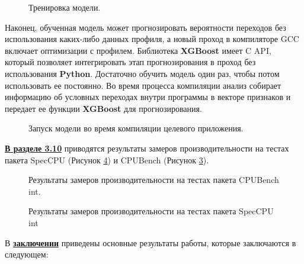   \begin{figure}[htbp]
  	\centering
  	
  	\caption{Тренировка модели.}
  	\label{op:mlpgo2}
  \end{figure}
  Наконец, обученная модель может прогнозировать вероятности  переходов  без использования каких-либо данных профиля, а новый проход в компиляторе GCC включает оптимизации с профилем. Библиотека \textbf{XGBoost} имеет C API, который позволяет интегрировать этап прогнозирования в проход без использования \textbf{Python}. Достаточно обучить модель один раз, чтобы потом использовать ее постоянно. Во время процесса компиляции  анализ собирает информацию об условных переходах  внутри программы в векторе признаков и передает ее функции \textbf{XGBoost} для прогнозирования.
  \begin{figure}[htbp]
  	\centering
  	
  	\caption{Запуск модели во время компиляции целевого приложения.}
  	\label{op:mlpgo3}
  \end{figure}
 
  \underline{\textbf{В разделе 3.10}} приводятся результаты замеров производительности на тестах пакета SpecCPU (Рисунок \ref{fig:spec_int_speedup}) и CPUBench (Рисунок \ref{fig:spubench_int_speedup}).
  
  \begin{figure}[ht]
  	\caption{Результаты замеров производительности на тестах  пакета CPUBench int.}\label{fig:spubench_int_speedup}
  \end{figure}
  
  \begin{figure}[ht]
  	\caption{Результаты замеров производительности на тестах  пакета SpecCPU int}\label{fig:spec_int_speedup}
  \end{figure}
  

\FloatBarrier
{}                                  %
В \underline{\textbf{заключении}} приведены основные результаты работы, которые заключаются в следующем:

